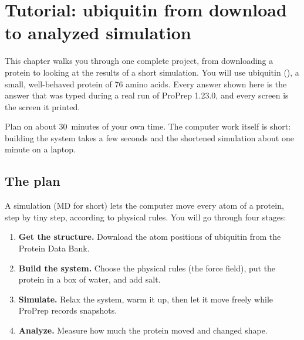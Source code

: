 \chapter{Tutorial: ubiquitin from download to analyzed simulation}
\label{ch:tutorial}

This chapter walks you through one complete project, from downloading a
protein to looking at the results of a short simulation. You will use
ubiquitin (), a small, well-behaved protein of 76 amino acids. Every
answer shown here is the answer that was typed during a real run of ProPrep
1.23.0, and every screen is the screen it printed.

Plan on about 30~minutes of your own time. The computer work itself is short:
building the system takes a few seconds and the shortened simulation about one
minute on a laptop.

\begin{glance}
\end{glance}

\section{The plan}

A  simulation (MD for short) lets the computer move
every atom of a protein, step by tiny step, according to physical rules. You
will go through four stages:

\begin{enumerate}
  \item \textbf{Get the structure.} Download the atom positions of ubiquitin
        from the Protein Data Bank.
  \item \textbf{Build the system.} Choose the physical rules (the force
        field), put the protein in a box of water, and add salt.
  \item \textbf{Simulate.} Relax the system, warm it up, then let it move
        freely while ProPrep records snapshots.
  \item \textbf{Analyze.} Measure how much the protein moved and changed shape.
\end{enumerate}

